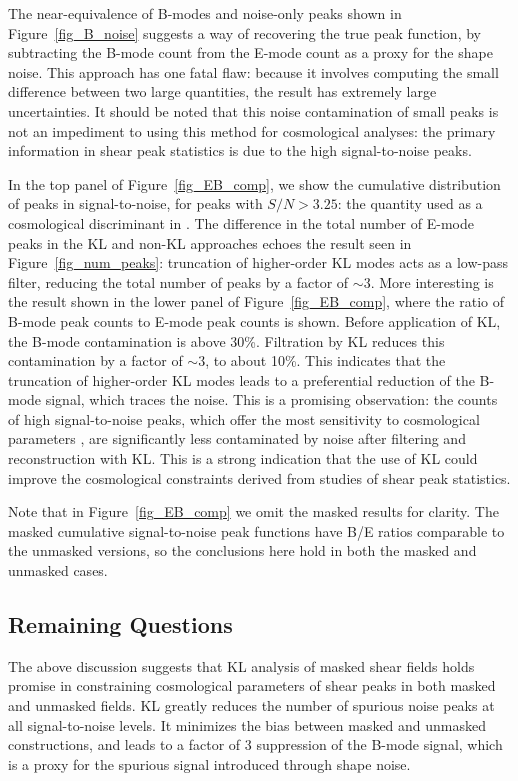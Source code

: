 \documentclass[twocolumn]{emulateapj}
\begin{document}
The near-equivalence of B-modes and noise-only peaks shown in 
Figure~\ref{fig_B_noise} suggests a way of recovering the true peak function,
by subtracting the B-mode count from the E-mode count as a proxy for the 
shape noise. This approach has one fatal flaw: because it involves computing
the small difference between two large quantities, the result has
extremely large uncertainties.  It should be
noted that this noise contamination of small peaks is not an impediment to
using this method for cosmological analyses: the primary information
in shear peak statistics is due to the high signal-to-noise peaks.

In the top panel of Figure~\ref{fig_EB_comp}, we show the cumulative 
distribution of peaks in signal-to-noise, for peaks with $S/N > 3.25$:
the quantity used as a cosmological discriminant in \citet{Dietrich10}.
The difference in the total number of E-mode peaks in the KL and non-KL
approaches echoes the result seen
in Figure~\ref{fig_num_peaks}: truncation of higher-order KL modes acts as
a low-pass filter, reducing the total number of peaks by a factor of $\sim 3$.
More interesting is the result shown in the lower panel of 
Figure~\ref{fig_EB_comp}, where the ratio of B-mode peak counts to E-mode 
peak counts is shown.  
Before application of KL, the B-mode contamination is above 
30\%.  Filtration by KL reduces this contamination by a factor of $\sim 3$,
to about 10\%.  This indicates that the truncation of higher-order KL modes
leads to a preferential reduction of the B-mode signal, which traces
the noise.  This is a promising observation: the counts of
high signal-to-noise peaks, 
which offer the most sensitivity to cosmological parameters 
\citep{Dietrich10}, are significantly less contaminated by noise after 
filtering and reconstruction with KL.  This is a strong indication that 
the use of KL could improve the cosmological 
constraints derived from studies of shear peak statistics.

Note that in Figure~\ref{fig_EB_comp} we omit the masked 
results for clarity.  The masked cumulative signal-to-noise peak 
functions have B/E ratios comparable to the unmasked versions, so 
the conclusions here hold in both the masked and unmasked cases.

\subsection{Remaining Questions}
The above discussion suggests that KL analysis of masked shear fields holds
promise in constraining cosmological parameters of shear peaks in both
masked and unmasked fields.  KL greatly
reduces the number of spurious noise peaks at all signal-to-noise levels.
It minimizes the bias between masked and unmasked constructions, and leads
to a factor of 3 suppression of the B-mode signal, which is a proxy
for the spurious signal introduced through shape noise.
\end{document}
